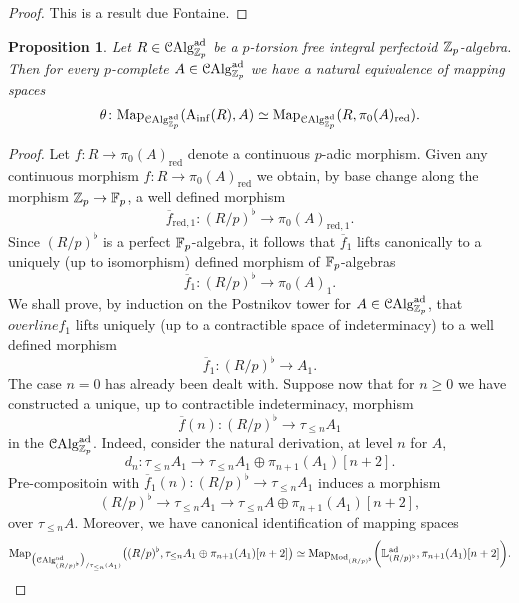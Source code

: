 \documentclass[10pt,a4paper]{amsart}
\numberwithin{equation}{subsection}
\newtheorem{proposition}[theorem]{Proposition}
\theoremstyle{definition}
\begin{document}
\begin{proof}
    This is a result due Fontaine.
\end{proof}

\begin{proposition} \label{Ainf_de_Rham}
    Let $R \in \mathcal C \mathrm{Alg}^{\mathrm{ad}}_{\mathbb Z_p}$ be a $p$-torsion free integral perfectoid $\mathbb Z_p$-algebra. Then for every $p$-complete $A \in \mathcal C \mathrm{Alg}^{\mathrm{ad}}_{\mathbb Z_p}$ we have a natural equivalence of mapping spaces
        \[
               \theta \colon \mathrm{Map}_{\mathcal C \mathrm{Alg}^{\mathrm{ad}}_{\mathbb Z_p}}(\mathrm{A}_{\mathrm{inf}}(R), A) \simeq   \mathrm{Map}_{\mathcal C \mathrm{Alg}^{\mathrm{ad}}_{\mathbb Z_p}}(R, \pi_0(A)_\mathrm{red}) .
        \]
\end{proposition}

\begin{proof}
    Let $f \colon R \to \pi_0(A)_\mathrm{red}$ denote a continuous $p$-adic morphism. Given any continuous morphism $f \colon R \to \pi_0(A)_\mathrm{red}$ we obtain, by base change along the morphism $\mathbb Z_p \to \mathbb F_p$, a well defined morphism
        \[
            \overline{f}_{\mathrm{red}, 1} \colon (R/p)^\flat \to \pi_0(A)_{\mathrm{red}, 1} . 
        \]
    Since $(R/p)^\flat $ is a perfect $\mathbb F_p$-algebra, it follows that $\overline{f}_1$ lifts canonically to a uniquely (up to isomorphism) defined morphism of $\mathbb F_p$-algebras
        \[
            \overline{f}_1 \colon (R/p)^\flat \to \pi_0(A)_1.  
        \]
    We shall prove, by induction on the Postnikov tower for $A \in \mathcal C \mathrm{Alg}^{\mathrm{ad}}_{\mathbb Z_p}$, that $overline{f}_1$ lifts uniquely (up to a contractible space of indeterminacy) to a well defined morphism
        \[
            \overline{f}_1 \colon (R/p)^\flat \to A_1.
        \]
    The case $n=0$ has already been dealt with. Suppose now that for $n \geq 0$ we have constructed a unique, up to contractible indeterminacy, morphism
        \[
            \overline{f}(n) \colon (R/p)^\flat \to \tau_{\leq n} A_1  
        \]
    in the \infcat $\mathcal C \mathrm{Alg}^{\mathrm{ad}}_{\mathbb Z_p}$. Indeed, consider the natural derivation, at level $n$ for $A$,
        \[
                d_n \colon \tau_{\leq n} A_1 \to \tau_{\leq n}A_1 \oplus \pi_{n+1}(A_1)[n+2].
        \]
    Pre-compositoin with $\overline{f}_1(n) \colon (R/p)^\flat \to \tau_{\leq n}A_1$ induces a morphism 
        \[
                (R/p)^\flat \to \tau_{\leq n}A_1 \to \tau_{\leq n}A   \oplus \pi_{n+1}(A_1)[n+2],
        \]
    over $\tau_{\leq n}A$. Moreover, we have canonical identification of mapping spaces
        \[
                \mathrm{Map}_{\big(\mathcal C \mathrm{Alg}^{\mathrm{ad}}_{(R/p)^\flat}\big)_{/ \tau_{\leq n}(A_1) }} \big((R/p)^\flat, \tau_{\leq n}A_1 \oplus \pi_{n+1}(A_1)[n+2] \big) \simeq
                \mathrm{Map}_{\mathrm{Mod}_{(R/p)^\flat}} \bigg(\mathbb{L}^{\mathrm{ad}}_{(R/p)^\flat}, \pi_{n+1}(A_1) [n+2] \bigg).
\]
\end{proof}
\end{document}
